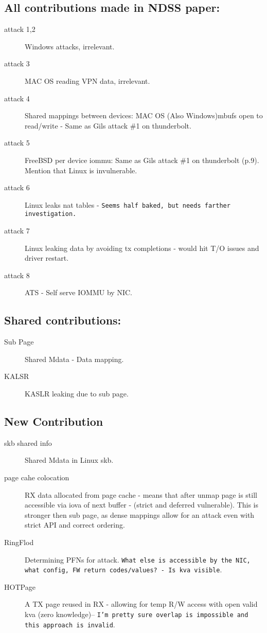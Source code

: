 \subsection{All contributions made in NDSS paper\cite{thunder}:}
\begin{description}
\item[attack 1,2] Windows attacks, irrelevant.
\item[attack 3] MAC OS reading VPN data, irrelevant.
\item[attack 4] Shared mappings between devices: MAC OS (Also Windows)mbufs open to read/write - Same as Gils  attack \#1 on thunderbolt.
\item[attack 5] FreeBSD per device iommu:  Same as Gils  attack \#1 on thunderbolt (p.9). Mention that Linux is invulnerable.
\item[attack 6] Linux leaks nat tables - \texttt{Seems half baked, but needs farther investigation.}
\item[attack 7] Linux leaking data by avoiding tx completions - would hit T/O issues and driver restart.
\item[attack 8] ATS - Self serve IOMMU by NIC. 
\end{description}

\subsection{Shared contributions:}
\begin{description}
\item[Sub Page] Shared Mdata - Data mapping.
\item[KALSR] KASLR leaking due to sub page.
\end{description}

\subsection{New Contribution}

\begin{description}
\item[skb shared info] Shared Mdata in Linux skb. 
\item[page cahe colocation] RX data allocated from page cache - means that after unmap page is still accessible via iova of next buffer - (strict and deferred vulnerable). This is stronger then sub page, as dense mappings 
allow for an attack even with strict API and correct ordering.
\item[RingFlod] Determining PFNs for attack. \texttt{What else is accessible by the NIC, what config, FW return codes/values? - Is kva visible}.
\item[HOTPage] A TX page reused in RX - allowing for temp R/W access with open valid kva (zero knowledge)-- \texttt{I'm pretty sure overlap is impossible and this approach is invalid}.
\end{description}

